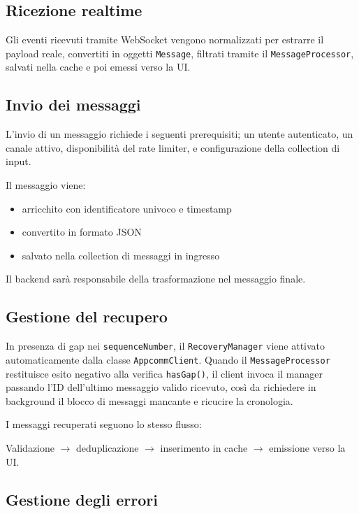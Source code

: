 \documentclass[a4paper, 11pt, twoside]{report}
\begin{document}
\subsection{Ricezione realtime}

Gli eventi ricevuti tramite WebSocket vengono normalizzati per estrarre il payload reale, convertiti in oggetti \texttt{Message},
filtrati tramite il \texttt{MessageProcessor}, salvati nella cache e poi emessi verso la UI.

\subsection{Invio dei messaggi}

L’invio di un messaggio richiede i seguenti prerequisiti; un utente autenticato, un canale attivo, disponibilità del rate limiter,
e configurazione della collection di input.

Il messaggio viene:
\begin{itemize}
    \item arricchito con identificatore univoco e timestamp
    \item convertito in formato JSON
    \item salvato nella collection di messaggi in ingresso
\end{itemize}

Il backend sarà responsabile della trasformazione nel messaggio finale.

\subsection{Gestione del recupero}

In presenza di gap nei \texttt{sequenceNumber}, il \texttt{RecoveryManager} viene attivato automaticamente dalla classe \texttt{AppcommClient}.
Quando il \texttt{MessageProcessor} restituisce esito negativo alla verifica \texttt{hasGap()}, il client invoca il manager passando
l'ID dell'ultimo messaggio valido ricevuto, così da richiedere in background il blocco di messaggi mancante e ricucire la cronologia.

I messaggi recuperati seguono lo stesso flusso:
\begin{center}
Validazione $\xrightarrow{}$ deduplicazione $\xrightarrow{}$ inserimento in cache $\xrightarrow{}$ emissione verso la UI.
\end{center}

\subsection{Gestione degli errori}
\end{document}
